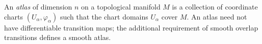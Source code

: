 
An \emph{atlas} of dimension $n$ on a topological manifold $M$ is a collection of coordinate charts $(U_\alpha,\varphi_\alpha)$ such that the chart domains $U_\alpha$ cover $M$. An atlas need not have differentiable transition maps; the additional requirement of smooth overlap transitions defines a smooth atlas.
